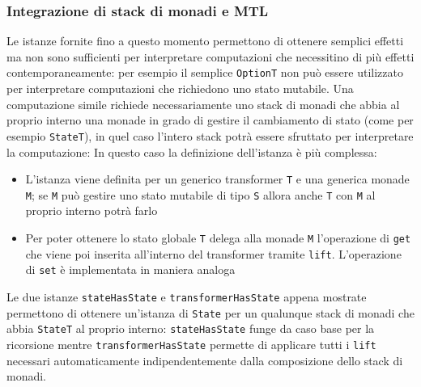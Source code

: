 \subsubsection{Integrazione di stack di monadi e MTL}
Le istanze fornite fino a questo momento permettono di ottenere semplici effetti ma non sono sufficienti per interpretare computazioni che necessitino di più effetti contemporaneamente: per esempio il semplice \lstinline{OptionT} non può essere utilizzato per interpretare computazioni che richiedono uno stato mutabile.
Una computazione simile richiede necessariamente uno stack di monadi che abbia al proprio interno una monade in grado di gestire il cambiamento di stato (come per esempio \lstinline{StateT}), in quel caso l'intero stack potrà essere sfruttato per interpretare la computazione:
In questo caso la definizione dell'istanza è più complessa:
\begin{itemize}
  \item L'istanza viene definita per un generico transformer \lstinline{T} e una generica monade \lstinline{M}; se \lstinline{M} può gestire uno stato mutabile di tipo \lstinline{S} allora anche \lstinline{T} con \lstinline{M} al proprio interno potrà farlo
  \item Per poter ottenere lo stato globale \lstinline{T} delega alla monade \lstinline{M} l'operazione di \lstinline{get} che viene poi inserita all'interno del transformer tramite \lstinline{lift}. L'operazione di \lstinline{set} è implementata in maniera analoga
\end{itemize}

Le due istanze \lstinline{stateHasState} e \lstinline{transformerHasState} appena mostrate permettono di ottenere un'istanza di \lstinline{State} per un qualunque stack di monadi che abbia \lstinline{StateT} al proprio interno: \lstinline{stateHasState} funge da caso base per la ricorsione mentre \lstinline{transformerHasState} permette di applicare tutti i \lstinline{lift} necessari automaticamente indipendentemente dalla composizione dello stack di monadi.

